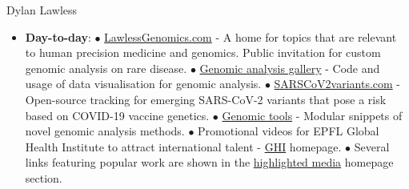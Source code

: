 \documentclass[11pt,a4paper]{article}
\begin{document}
\begin{cv}{Dylan Lawless}
\begin{itemize}[leftmargin=*]
\item
\textbf{Day-to-day}: 
$\bullet$ \href{https://lawlessgenomics.com}{LawlessGenomics.com} - A home for topics that are relevant to human precision medicine and genomics. Public invitation for custom genomic analysis on rare disease.
$\bullet$ \href{https://lawlessgenomics.com/portfolio}{Genomic analysis gallery} - Code and usage of data visualisation for genomic analysis.
$\bullet$ \href{https://sarscov2variants.com}{SARSCoV2variants.com} - Open-source tracking for emerging SARS-CoV-2 variants that pose a risk based on COVID-19 vaccine genetics.
$\bullet$ \href{https://github.com/DylanLawless/genomics_tools}{Genomic tools} - Modular snippets of novel genomic analysis methods.
$\bullet$ Promotional videos for EPFL Global Health Institute to attract international talent - \href{https://www.epfl.ch/schools/sv/ghi/}{GHI} homepage.
$\bullet$ Several links featuring popular work are shown in the \href{https://lawlessgenomics.com}{highlighted media} homepage section.


\end{itemize}
\end{cv}
\end{document}

